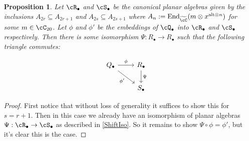 \documentclass[11pt]{article}
\theoremstyle{plain}
\newtheorem{prop}[thm]{Proposition}
\theoremstyle{definition}
\DeclareMathOperator{\End}{End}
\newcommand{\xalt}{x^{\text{alt}\otimes n}}
\begin{document}
\begin{prop}
Let $\cR_{\bullet}$ and $\cS_{\bullet}$ be the canonical planar algebras given by the inclusions $A_{2r}\subseteq A_{2r+1}$ and $A_{2s}\subseteq A_{2s+1}$ where $A_n:=\End_{\widetilde{\cC}}(m\otimes \xalt)$ for some $m\in \cC_{20}$. Let $\phi$ and $\phi'$ be the embeddings of $\cQ_{\bullet}$ into $\cR_{\bullet}$ and $\cS_{\bullet}$ respectively. Then there is some isomorphism $\Psi:R_{\bullet}\rightarrow R_{\bullet}$ such that the following triangle commutes:

$$
  \begin{tikzcd}
    Q_{\bullet} \arrow{r}{\phi} \arrow[swap]{dr}{\phi'} & R_{\bullet} \arrow{d}{\Psi} \\
     & S_{\bullet}
  \end{tikzcd}
$$  
\end{prop}

\begin{proof}
First notice that without loss of generality it suffices to show this for $s=r+1$. Then in this case we already have an isomorphism of planar algebras $\Psi:\cR_{\bullet}\rightarrow \cS_{\bullet}$ as described in \ref{ShiftIso}. So it remains to show $\Psi\circ \phi=\phi'$, but it's clear this is the case.
\end{proof}


{\footnotesize{

}}
\end{document}
